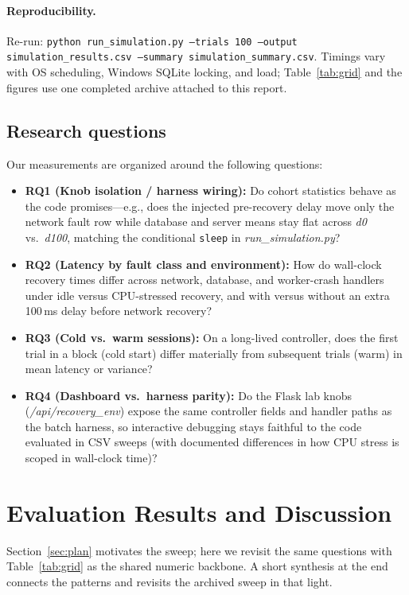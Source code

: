 \documentclass[sigconf,authorversion,nonacm]{acmart}
\begin{document}
\paragraph{Reproducibility.}
Re-run: {\footnotesize\texttt{python run\_simulation.py --trials 100 --output simulation\_results.csv --summary simulation\_summary.csv}}. Timings vary with OS scheduling, Windows SQLite locking, and load; Table~\ref{tab:grid} and the figures use one completed archive attached to this report.

\subsection{Research questions}
Our measurements are organized around the following questions:
\begin{itemize}[leftmargin=*,nosep]
  \item \textbf{RQ1 (Knob isolation / harness wiring):} Do cohort statistics behave as the code promises---e.g., does the injected pre-recovery delay move only the network fault row while database and server means stay flat across \emph{d0} vs.\ \emph{d100}, matching the conditional \texttt{sleep} in \emph{run\_simulation.py}?
  \item \textbf{RQ2 (Latency by fault class and environment):} How do wall-clock recovery times differ across network, database, and worker-crash handlers under idle versus CPU-stressed recovery, and with versus without an extra 100\,ms delay before network recovery?
  \item \textbf{RQ3 (Cold vs.\ warm sessions):} On a long-lived controller, does the first trial in a block (cold start) differ materially from subsequent trials (warm) in mean latency or variance?
  \item \textbf{RQ4 (Dashboard vs.\ harness parity):} Do the Flask lab knobs (\emph{/api/recovery\_env}) expose the same controller fields and handler paths as the batch harness, so interactive debugging stays faithful to the code evaluated in CSV sweeps (with documented differences in how CPU stress is scoped in wall-clock time)?
\end{itemize}

\section{Evaluation Results and Discussion}
\label{sec:results}
Section~\ref{sec:plan} motivates the sweep; here we revisit the same questions with Table~\ref{tab:grid} as the shared numeric backbone. A short synthesis at the end connects the patterns and revisits the archived sweep in that light.
\end{document}
